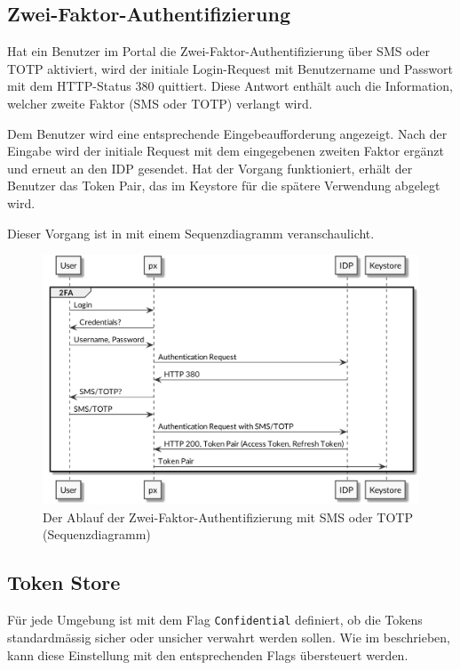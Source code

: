 \subsection{Zwei-Faktor-Authentifizierung}

Hat ein Benutzer im Portal die Zwei-Faktor-Authentifizierung über SMS oder TOTP aktiviert, wird der initiale Login-Request mit Benutzername und Passwort mit dem HTTP-Status 380 quittiert. Diese Antwort enthält auch die Information, welcher zweite Faktor (SMS oder TOTP) verlangt wird.

Dem Benutzer wird eine entsprechende Eingebeaufforderung angezeigt. Nach der Eingabe wird der initiale Request mit dem eingegebenen zweiten Faktor ergänzt und erneut an den IDP gesendet. Hat der Vorgang funktioniert, erhält der Benutzer das Token Pair, das im Keystore für die spätere Verwendung abgelegt wird.

Dieser Vorgang ist in  mit einem Sequenzdiagramm veranschaulicht.

\begin{figure}
    \centering
    \includegraphics[width=\linewidth]{pics/sequence-2fa.png}
    \caption{Der Ablauf der Zwei-Faktor-Authentifizierung mit SMS oder TOTP (Sequenzdiagramm)}
    \label{fig:2fa}
\end{figure}

\subsection{Token Store}
\label{sec:Realisierung-Token-Store}

Für jede Umgebung ist mit dem Flag \texttt{Confidential} definiert, ob die Tokens standardmässig sicher oder unsicher verwahrt werden sollen. Wie im  beschrieben, kann diese Einstellung mit den entsprechenden Flags übersteuert werden.

